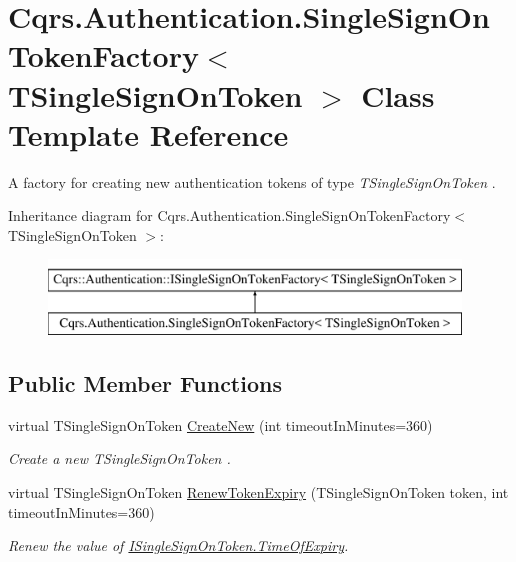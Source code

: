\hypertarget{classCqrs_1_1Authentication_1_1SingleSignOnTokenFactory}{}\section{Cqrs.\+Authentication.\+Single\+Sign\+On\+Token\+Factory$<$ T\+Single\+Sign\+On\+Token $>$ Class Template Reference}
\label{classCqrs_1_1Authentication_1_1SingleSignOnTokenFactory}


A factory for creating new authentication tokens of type {\itshape T\+Single\+Sign\+On\+Token} .  


Inheritance diagram for Cqrs.\+Authentication.\+Single\+Sign\+On\+Token\+Factory$<$ T\+Single\+Sign\+On\+Token $>$\+:\begin{figure}[H]
\begin{center}
\leavevmode
\includegraphics[height=2.000000cm]{classCqrs_1_1Authentication_1_1SingleSignOnTokenFactory}
\end{center}
\end{figure}
\subsection*{Public Member Functions}
\begin{DoxyCompactItemize}
\item 
virtual T\+Single\+Sign\+On\+Token \hyperlink{classCqrs_1_1Authentication_1_1SingleSignOnTokenFactory_ab4d01a3600dbe9aa358cd93c98ccf281_ab4d01a3600dbe9aa358cd93c98ccf281}{Create\+New} (int timeout\+In\+Minutes=360)
\begin{DoxyCompactList}\small\item\em Create a new {\itshape T\+Single\+Sign\+On\+Token} . \end{DoxyCompactList}\item 
virtual T\+Single\+Sign\+On\+Token \hyperlink{classCqrs_1_1Authentication_1_1SingleSignOnTokenFactory_a699ceac65874b8319d2e26fa88f554be_a699ceac65874b8319d2e26fa88f554be}{Renew\+Token\+Expiry} (T\+Single\+Sign\+On\+Token token, int timeout\+In\+Minutes=360)
\begin{DoxyCompactList}\small\item\em Renew the value of \hyperlink{interfaceCqrs_1_1Authentication_1_1ISingleSignOnToken_a50af484569cc78f88acb01f1938a7cd8_a50af484569cc78f88acb01f1938a7cd8}{I\+Single\+Sign\+On\+Token.\+Time\+Of\+Expiry}. \end{DoxyCompactList}\end{DoxyCompactItemize}


